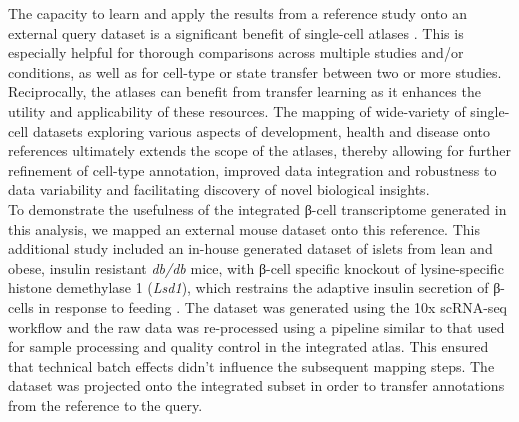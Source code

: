 
The capacity to learn and apply the results from a reference study onto an external query dataset is a significant benefit of single-cell atlases \textbf{\cite{lotfollahi_mapping_2021,lotfollahi_biologically_2023,ye_mapping_2024}}. This is especially helpful for thorough comparisons across multiple studies and/or conditions, as well as for cell-type or state transfer between two or more studies. Reciprocally, the atlases can benefit from transfer learning as it enhances the utility and applicability of these resources. The mapping of wide-variety of single-cell datasets exploring various aspects of development, health and disease onto references ultimately extends the scope of the atlases, thereby allowing for further refinement of cell-type annotation, improved data integration and robustness to data variability and facilitating discovery of novel biological insights.\\

To demonstrate the usefulness of the integrated β-cell transcriptome generated in this analysis, we mapped an external mouse dataset onto this reference. This additional study included an in-house generated dataset of islets from lean and obese, insulin resistant \textit{db/db} mice, with β-cell specific knockout of lysine-specific histone demethylase 1 (\textit{Lsd1}), which restrains the adaptive insulin secretion of β-cells in response to feeding \textbf{\cite{wortham_nutrient_2023}}. The dataset was generated using the 10x scRNA-seq workflow and the raw data was re-processed using a pipeline similar to that used for sample processing and quality control in the integrated atlas. This ensured that technical batch effects didn't influence the subsequent mapping steps. The dataset was projected onto the integrated subset in order to transfer annotations from the reference to the query.


